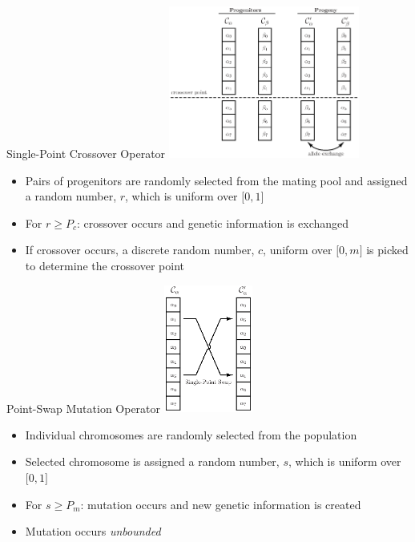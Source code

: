 \documentclass[
	style=aggie,
	mode=present,
	size=10pt,
	paper=screen,
	orient=landscape,
	display=slides,
]{powerdot}
\begin{document}
\begin{slide}[toc=Crossover,bm=Crossover]{Single-Point Crossover Operator}
	\vfill
	\centering
	\includegraphics[height=5cm]{crossover}
	\vfill
	\begin{itemize}
 		\item Pairs of progenitors are randomly selected from the mating pool and assigned
		a random number, $r$, which is uniform over $\bigl[0,1\bigr]$
		\vfill
 		\item For $r\geq P_c$: crossover occurs and genetic information is exchanged
 		\vfill
  		\item If crossover occurs, a discrete random number, $c$, uniform over
		$\bigl[0,m\bigr]$ is picked to determine the crossover point
	\end{itemize}
	\vfill \strut
\end{slide}

\begin{slide}[toc=Mutation,bm=Mutation]{Point-Swap Mutation Operator}
	\vfill
	\centering
	\includegraphics[height=4.2cm]{single_point_mutation}
	\vfill
	\begin{itemize}
		\item Individual chromosomes are randomly selected from the population
		\vfill
		\item Selected chromosome is assigned a random number, $s$, which is uniform over
		$\bigl[0,1\bigr]$
		\vfill
		\item For $s\geq P_m$: mutation occurs and new genetic information is created
		\vfill
		\item Mutation occurs \textit{unbounded}
	\end{itemize}
	\vfill \strut
\end{slide}
\end{document}
